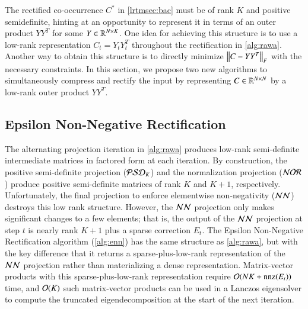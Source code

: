 The rectified co-occurrence $C^*$ in \cref{lrtmsec:bac} must be of rank $K$ and
positive semidefinite, hinting at an opportunity to represent it in terms of an
outer product $Y Y^T$ for some $Y \in \mathbb{R}^{N \mathbin{\times} K}$. One idea for achieving
this structure is to use a low\hyp{}rank representation $C_t = Y_t Y_t^T$
throughout the rectification in \cref{alg:rawa}. Another way to obtain this
structure is to directly minimize $\left\lVert C - Y Y^T\right\rVert_F$ with the necessary
constraints. In this section, we propose two new algorithms to simultaneously
compress and rectify the input by representing $C \in \mathbb{R}^{N \mathbin{\times} N}$ by a
low\hyp{}rank outer product $Y Y^T$.

\subsection{Epsilon Non-Negative Rectification}
The alternating projection iteration in \cref{alg:rawa} produces
low\hyp{}rank semi\hyp{}definite intermediate matrices in factored form at each
iteration. By construction, the positive semi\hyp{}definite projection 
($\mathcal{PSD}_K$) and the normalization projection ($\mathcal{NOR}$) produce positive
semi\hyp{}definite matrices of rank $K$ and $K+1$, respectively.  Unfortunately,
the final projection to enforce elementwise non-negativity ($\mathcal{NN}$) destroys this
low rank structure. However, the $\mathcal{NN}$ projection only makes significant changes
to a few elements; that is, the output of the $\mathcal{NN}$ projection at step $t$ is
nearly rank $K+1$ plus a sparse correction $E_t$.  The Epsilon Non\hyp{}Negative
Rectification algorithm (\cref{alg:enn}) has the same structure as 
\cref{alg:rawa}, but with the key difference that it returns a
sparse\hyp{}plus\hyp{}low\hyp{}rank representation of the $\mathcal{NN}$ projection
rather than materializing a dense representation. Matrix\hyp{}vector products
with this sparse\hyp{}plus\hyp{}low\hyp{}rank representation require $\mathcal{O}(NK + 
\operatorname{nnz}(E_t))$ time, and $\mathcal{O}(K)$ such matrix\hyp{}vector products
can be used in a Lanczos eigensolver to compute the truncated eigendecomposition
at the start of the next iteration.

